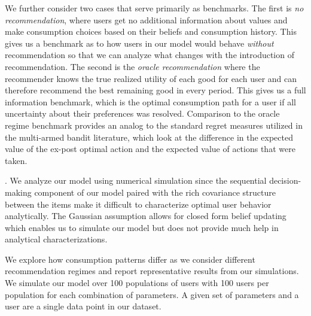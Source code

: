 \documentclass[format=acmsmall, review=false]{acmart}
\newcommand{\xhdr}[1]{\vspace{1mm} \noindent{\bf #1}}
\begin{document}
We further consider two cases that serve primarily as benchmarks. The first is \textit{no recommendation}, where users get no additional information about values and make consumption choices based on their beliefs and consumption history. This gives us a benchmark as to how users in our model would behave \textit{without} recommendation so that we can analyze what changes with the introduction of recommendation. The second is the \textit{oracle recommendation} where the recommender knows the true realized utility of each good for each user and can therefore recommend the best remaining good in every period. This gives us a full information benchmark, which is the optimal consumption path for a user if all uncertainty about their preferences was resolved. Comparison to the oracle regime benchmark provides an analog to the standard regret measures utilized in the multi-armed bandit literature, which look at the difference in the expected value of the ex-post optimal action and the expected value of actions that were taken.
\par

\xhdr{Simulation Details}. 
We analyze our model using numerical simulation since the sequential decision-making component of our model paired with the rich covariance structure between the items make it difficult to characterize optimal user behavior analytically. The Gaussian assumption allows for closed form belief updating which enables us to simulate our model but does not provide much help in analytical characterizations. 
\par

We explore how consumption patterns differ as we consider different recommendation regimes and report representative results from our simulations. We simulate our model over 100 populations of users with 100 users per population for each combination of parameters. 
A given set of parameters and a user are a single data point in our dataset.
\par
\end{document}
